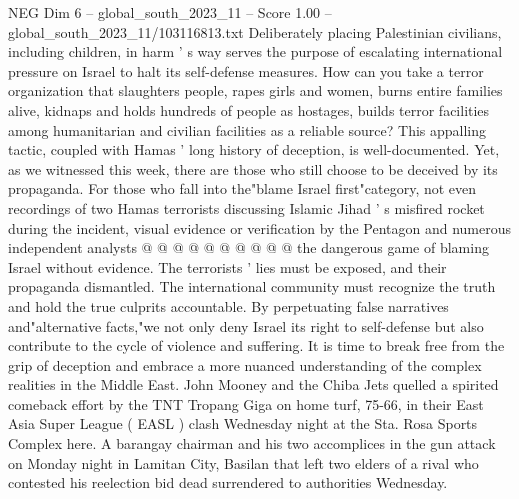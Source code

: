 \begin{textsample}{NEG Dim 6 – global\_south\_2023\_11 – Score 1.00 – global\_south\_2023\_11/103116813.txt}
Deliberately placing Palestinian civilians, including children, in harm ' s way serves the purpose of escalating international pressure on Israel to halt its self-defense measures.
How can you take a terror organization that slaughters people, rapes girls and women, burns entire families alive, kidnaps and holds hundreds of people as hostages, builds terror facilities among humanitarian and civilian facilities as a reliable source?
This appalling tactic, coupled with Hamas ' long history of deception, is well-documented.
Yet, as we witnessed this week, there are those who still choose to be deceived by its propaganda.
For those who fall into the"blame Israel first"category, not even recordings of two Hamas terrorists discussing Islamic Jihad ' s misfired rocket during the incident, visual evidence or verification by the Pentagon and numerous independent analysts @ @ @ @ @ @ @ @ @ @ the dangerous game of blaming Israel without evidence.
The terrorists ' lies must be exposed, and their propaganda dismantled.
The international community must recognize the truth and hold the true culprits accountable.
By perpetuating false narratives and"alternative facts,"we not only deny Israel its right to self-defense but also contribute to the cycle of violence and suffering.
It is time to break free from the grip of deception and embrace a more nuanced understanding of the complex realities in the Middle East.
John Mooney and the Chiba Jets quelled a spirited comeback effort by the TNT Tropang Giga on home turf, 75-66, in their East Asia Super League ( EASL ) clash Wednesday night at the Sta.
Rosa Sports Complex here.
A barangay chairman and his two accomplices in the gun attack on Monday night in Lamitan City, Basilan that left two elders of a rival who contested his reelection bid dead surrendered to authorities Wednesday.

\end{textsample}
